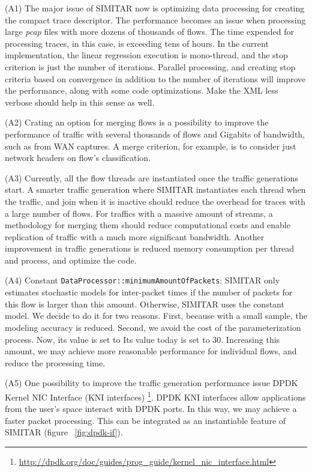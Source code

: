 (A1) The major issue of SIMITAR now is optimizing data processing for creating the compact trace descriptor. The performance becomes an issue when processing large \textit{pcap} files with more dozens of thousands of flows. The time expended for processing traces, in this case, is exceeding tens of hours. In the current implementation, the linear regression execution is mono-thread, and the stop criterion is just the number of iterations. Parallel processing, and creating stop criteria based on convergence in addition to the number of iterations will improve the performance, along with some code optimizations. Make the XML less verbose should help in this sense as well.  

(A2) Crating an option for merging flows is a possibility to improve the performance of traffic with several thousands of flows and Gigabits of bandwidth, such as from WAN captures. A merge criterion, for example, is to consider just network headers on flow's classification.


(A3) Currently, all the flow threads are instantiated once the traffic generations start. A smarter traffic generation where SIMITAR instantiates each thread when the traffic, and join when it is inactive should reduce the overhead for traces with a large number of flows. For traffics with a massive amount of streams, a methodology for merging them should reduce computational costs and enable replication of traffic with a much more significant bandwidth. Another improvement in traffic generations is reduced memory consumption per thread and process, and optimize the code.


(A4) Constant \texttt{DataProcessor::minimumAmountOfPackets}: SIMITAR only estimates stochastic models for inter-packet times if the number of packets for this flow is larger than this amount. Otherwise, SIMITAR uses the constant model. We decide to do it for two reasons. First, because with a small sample, the modeling accuracy is reduced. Second, we avoid the cost of the parameterization process. Now, its value is set to Its value today is set to 30. Increasing this amount, we may achieve more reasonable performance for individual flows, and reduce the processing time. 


(A5) One possibility to improve the traffic generation performance issue DPDK Kernel NIC Interface  (KNI interfaces) \footnote{\href{http://dpdk.org/doc/guides/prog_guide/kernel_nic_interface.html}{http://dpdk.org/doc/guides/prog\_guide/kernel\_nic\_interface.html}}. DPDK KNI interfaces allow applications from the user's space interact with DPDK ports. In this way, we may achieve a faster packet processing. This can be integrated as an instantiable feature of SIMITAR (figure ~\ref{fig:dpdk-if}).



